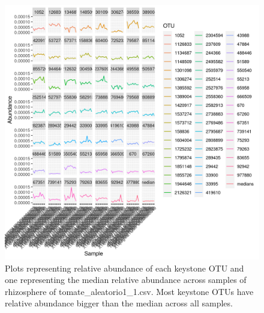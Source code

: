 \begin{figure}
   \centering
   \includegraphics[scale = 0.8]{abundance_tomate_aleatorio1_1.csv_key_otus_medians.png}
   \caption{Plots representing relative abundance of each keystone OTU and one representing the median relative abundance  across samples of rhizosphere of tomate_aleatorio1_1.csv. Most keystone OTUs have relative abundance bigger than the median across all samples.  }
   \label{key_otus_vs_medians_tomate_aleatorio1_1.csv}
\end{figure}
